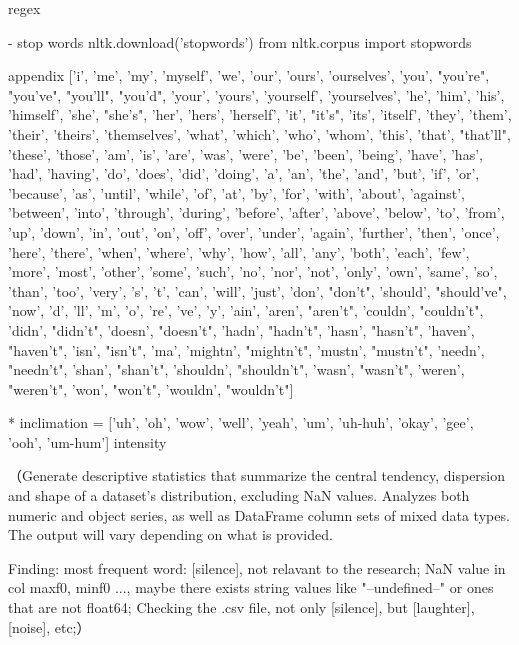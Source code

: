 regex

- stop words
nltk.download('stopwords')
from nltk.corpus import stopwords

appendix
['i', 'me', 'my', 'myself', 'we', 'our', 'ours', 'ourselves', 'you', "you're", "you've", "you'll", "you'd", 'your', 'yours', 'yourself', 'yourselves', 'he', 'him', 'his', 'himself', 'she', "she's", 'her', 'hers', 'herself', 'it', "it's", 'its', 'itself', 'they', 'them', 'their', 'theirs', 'themselves', 'what', 'which', 'who', 'whom', 'this', 'that', "that'll", 'these', 'those', 'am', 'is', 'are', 'was', 'were', 'be', 'been', 'being', 'have', 'has', 'had', 'having', 'do', 'does', 'did', 'doing', 'a', 'an', 'the', 'and', 'but', 'if', 'or', 'because', 'as', 'until', 'while', 'of', 'at', 'by', 'for', 'with', 'about', 'against', 'between', 'into', 'through', 'during', 'before', 'after', 'above', 'below', 'to', 'from', 'up', 'down', 'in', 'out', 'on', 'off', 'over', 'under', 'again', 'further', 'then', 'once', 'here', 'there', 'when', 'where', 'why', 'how', 'all', 'any', 'both', 'each', 'few', 'more', 'most', 'other', 'some', 'such', 'no', 'nor', 'not', 'only', 'own', 'same', 'so', 'than', 'too', 'very', 's', 't', 'can', 'will', 'just', 'don', "don't", 'should', "should've", 'now', 'd', 'll', 'm', 'o', 're', 've', 'y', 'ain', 'aren', "aren't", 'couldn', "couldn't", 'didn', "didn't", 'doesn', "doesn't", 'hadn', "hadn't", 'hasn', "hasn't", 'haven', "haven't", 'isn', "isn't", 'ma', 'mightn', "mightn't", 'mustn', "mustn't", 'needn', "needn't", 'shan', "shan't", 'shouldn', "shouldn't", 'wasn', "wasn't", 'weren', "weren't", 'won', "won't", 'wouldn', "wouldn't"]

* inclimation = ['uh', 'oh', 'wow', 'well', 'yeah', 'um', 'uh-huh', 'okay', 'gee', 'ooh', 'um-hum']
intensity


（Generate descriptive statistics that summarize the central tendency, dispersion and shape of a dataset's distribution, excluding NaN values.
Analyzes both numeric and object series, as well as DataFrame column sets of mixed data types. The output will vary depending on what is provided.

Finding:
most frequent word: [silence], not relavant to the research;
NaN value in col maxf0, minf0 ..., maybe there exists string values like "--undefined--" or ones that are not float64;
Checking the .csv file, not only [silence], but [laughter], [noise], etc;）



